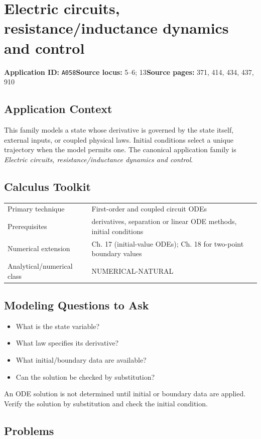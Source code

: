 \documentclass[11pt]{book}
\newcommand{\pid}[1]{\texttt{#1}}
\begin{document}
\chapter{Electric circuits, resistance/inductance dynamics and control}\label{app:A058}
\textbf{Application ID:} \pid{A058}\quad \textbf{Source locus:} 5–6; 13\quad \textbf{Source pages:} 371, 414, 434, 437, 910
\section*{Application Context}
This family models a state whose derivative is governed by the state itself, external inputs, or coupled physical laws. Initial conditions select a unique trajectory when the model permits one. The canonical application family is \emph{Electric circuits, resistance/inductance dynamics and control}.
\section*{Calculus Toolkit}
\begin{tabularx}{\textwidth}{@{}lX@{}}\toprule
Primary technique & First-order and coupled circuit ODEs \\
Prerequisites & derivatives, separation or linear ODE methods, initial conditions \\
Numerical extension & Ch. 17 (initial-value ODEs); Ch. 18 for two-point boundary values \\
Analytical/numerical class & NUMERICAL-NATURAL \\
\bottomrule\end{tabularx}
\section*{Modeling Questions to Ask}\begin{itemize}
\item What is the state variable?
\item What law specifies its derivative?
\item What initial/boundary data are available?
\item Can the solution be checked by substitution?
\end{itemize}
\begin{errorbox}An ODE solution is not determined until initial or boundary data are applied. Verify the solution by substitution and check the initial condition.\end{errorbox}
\section*{Problems}
\end{document}
